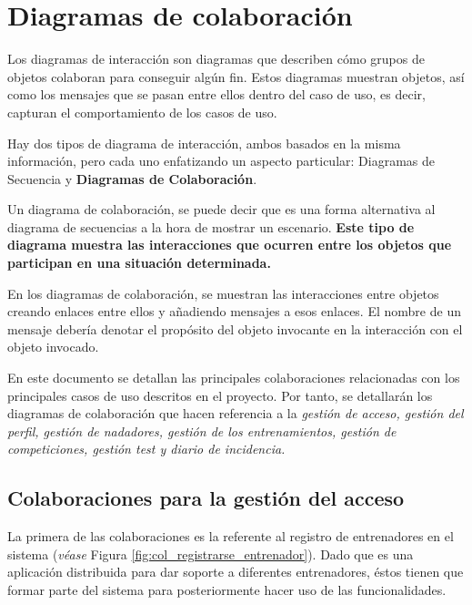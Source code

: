 	\newpage
	
	\section{Diagramas de colaboración} %
		\label{sec:diagramas_de_colaboracion}
	
		Los diagramas de interacción son diagramas que describen cómo grupos de objetos colaboran para conseguir algún fin. Estos diagramas muestran objetos, así como los mensajes que se pasan entre ellos dentro del caso de uso, es decir, capturan el comportamiento de los casos de uso.
		
		Hay dos tipos de diagrama de interacción, ambos basados en la misma información, pero cada uno enfatizando un aspecto particular: Diagramas de Secuencia y {\bf Diagramas de Colaboración}.
		
		Un diagrama de colaboración, se puede decir que es una forma alternativa al diagrama de secuencias a la hora de mostrar un escenario. {\bf Este tipo de diagrama muestra las interacciones que ocurren entre los objetos que participan en una situación determinada.}
		
		En los diagramas de colaboración, se muestran las interacciones entre objetos creando enlaces entre ellos y añadiendo mensajes a esos enlaces. El nombre de un mensaje debería denotar el propósito del objeto invocante en la interacción con el objeto invocado.
		
		En este documento se detallan las principales colaboraciones relacionadas con los principales casos de uso descritos en el proyecto. Por tanto, se detallarán los diagramas de colaboración que hacen referencia a la {\it gestión de acceso, gestión del perfil, gestión de nadadores, gestión de los entrenamientos, gestión de competiciones, gestión test y diario de incidencia.}
		
		\subsection{Colaboraciones para la gestión del acceso} %
			\label{sub:colaboraciones_para_la_gestion_del_acceso}
		
		La primera de las colaboraciones es la referente al registro de entrenadores en el sistema ({\it véase} Figura \ref{fig:col_registrarse_entrenador}). Dado que es una aplicación distribuida para dar soporte a diferentes entrenadores, éstos tienen que formar parte del sistema  para posteriormente hacer uso de las funcionalidades. 
		
